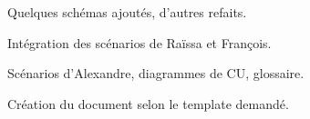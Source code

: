 
Quelques schémas ajoutés, d'autres refaits.
\par
{}
Intégration des scénarios de Raïssa et François.
\par
{} 
Scénarios d'Alexandre, diagrammes de CU, glossaire.
\par
{} 
Création du document selon le template demandé.
\par
